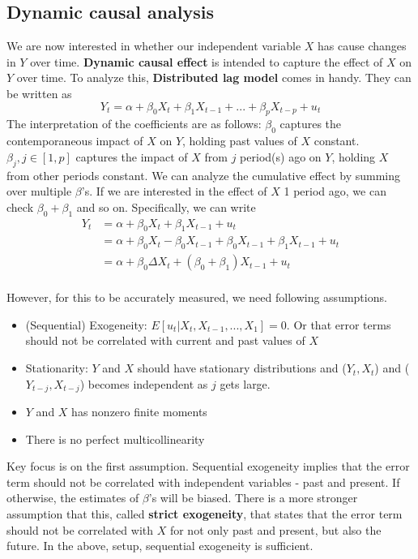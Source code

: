 \documentclass[12pt]{article}
\theoremstyle{definition}
\theoremstyle{property}
\theoremstyle{assumption}
\theoremstyle{example}
\theoremstyle{comment}
\begin{document}
\subsection{Dynamic causal analysis}
We are now interested in whether our independent variable $X$ has cause changes in $Y$ over time. \textbf{Dynamic causal effect} is intended to capture the effect of $X$ on $Y$ over time. To analyze this, \textbf{Distributed lag model} comes in handy. They can be written as
\[
Y_t = \alpha+\beta_0X_t + \beta_1X_{t-1}+...+\beta_pX_{t-p}+u_t
\]
The interpretation of the coefficients are as follows: $\beta_0$ captures the contemporaneous impact of $X$ on $Y$, holding past values of $X$ constant. $\beta_j , j\in[1,p]$ captures the impact of $X$ from $j$ period(s) ago on $Y$, holding $X$ from other periods constant. We can analyze the cumulative effect by summing over multiple $\beta$'s. If we are interested in the effect of $X$ 1 period ago, we can check $\beta_0 + \beta_1$ and so on. Specifically, we can write
\[
\begin{aligned}
Y_t& = \alpha+\beta_0X_t + \beta_1X_{t-1}+u_t\\
&=\alpha +\beta_0 X_t - \beta_0X_{t-1} + \beta_0 X_{t-1} + \beta_1 X_{t-1}+u_t \\
&=\alpha + \beta_0\Delta X_t + (\beta_0 + \beta_1)X_{t-1}+u_t\\
\end{aligned}
\]
\par\medskip
However, for this to be accurately measured, we need following assumptions. 
\begin{itemize}
\item (Sequential) Exogeneity: $E[u_t|X_t, X_{t-1},...,X_1]=0$. Or that error terms should not be correlated with current and past values of $X$
\item Stationarity: $Y$ and $X$ should have stationary distributions and ($Y_t, X_t$) and ($Y_{t-j}, X_{t-j}$) becomes independent as $j$ gets large. 
\item $Y$ and $X$ has nonzero finite moments
\item There is no perfect multicollinearity
\end{itemize}
Key focus is on the first assumption. Sequential exogeneity implies that the error term should not be correlated with independent variables - past and present. If otherwise, the estimates of $\beta$'s will be biased. There is a more stronger assumption that this, called \textbf{strict exogeneity}, that states that the error term should not be correlated with $X$ for not only past and present, but also the future. In the above, setup, sequential exogeneity is sufficient.
\end{document}
